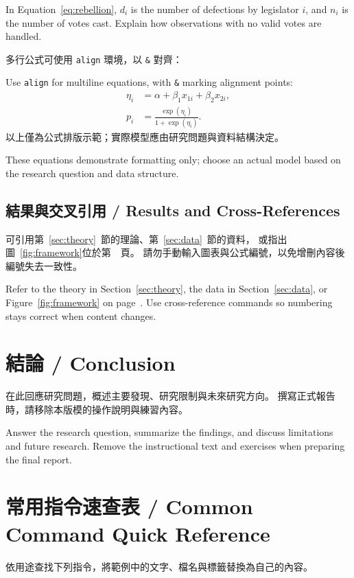 \documentclass[11pt,a4paper]{article}
\begin{document}
In Equation~\eqref{eq:rebellion}, $d_i$ is the number of defections by legislator $i$, and $n_i$ is the number of votes cast. Explain how observations with no valid votes are handled.

多行公式可使用 \texttt{align} 環境，以 \texttt{\&} 對齊：

Use \texttt{align} for multiline equations, with \texttt{\&} marking alignment points:
\begin{align}
  \eta_i &= \alpha + \beta_1 x_{1i} + \beta_2 x_{2i}, \\
  p_i &= \frac{\exp(\eta_i)}{1+\exp(\eta_i)}.
\end{align}
以上僅為公式排版示範；實際模型應由研究問題與資料結構決定。

These equations demonstrate formatting only; choose an actual model based on the research question and data structure.

\subsection{結果與交叉引用 / Results and Cross-References}
可引用第~\ref{sec:theory}~節的理論、第~\ref{sec:data}~節的資料，
或指出圖~\ref{fig:framework}位於第~\pageref{fig:framework}~頁。
請勿手動輸入圖表與公式編號，以免增刪內容後編號失去一致性。

Refer to the theory in Section~\ref{sec:theory}, the data in Section~\ref{sec:data}, or Figure~\ref{fig:framework} on page~\pageref{fig:framework}. Use cross-reference commands so numbering stays correct when content changes.

\section{結論 / Conclusion}
在此回應研究問題，概述主要發現、研究限制與未來研究方向。
撰寫正式報告時，請移除本版模的操作說明與練習內容。

Answer the research question, summarize the findings, and discuss limitations and future research. Remove the instructional text and exercises when preparing the final report.



\clearpage

\printbibliography[heading=bibintoc,title={參考文獻 / References}]


\appendix
\section{常用指令速查表 / Common Command Quick Reference}
依用途查找下列指令，將範例中的文字、檔名與標籤替換為自己的內容。
\end{document}
